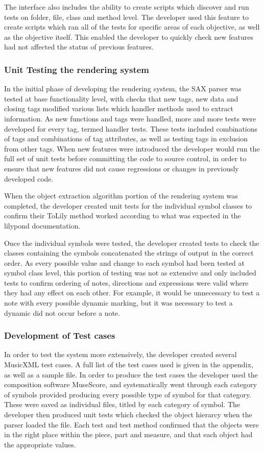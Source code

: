 The interface also includes the ability to create scripts which discover and run tests on folder, file, class and method level. The developer used this feature to create scripts which ran all of the tests for specific areas of each objective, as well as the objective itself. This enabled the developer to quickly check new features had not affected the status of previous features.
\subsubsection{Unit Testing the rendering system}
In the initial phase of developing the rendering system, the SAX parser was tested at base functionality level, with checks that new tags, new data and closing tags modified various lists which handler methods used to extract information. As new functions and tags were handled, more and more tests were developed for every tag, termed handler tests. These tests included combinations of tags and combinations of tag attributes, as well as testing tags in exclusion from other tags. When new features were introduced the developer would run the full set of unit tests before committing the code to source control, in order to ensure that new features did not cause regressions or changes in previously developed code.

When the object extraction algorithm portion of the rendering system was completed, the developer created unit tests for the individual symbol classes to confirm their ToLily method worked according to what was expected in the lilypond documentation.

Once the individual symbols were tested, the developer created tests to check the classes containing the symbols concatenated the strings of output in the correct order. As every possible value and change to each symbol had been tested at symbol class level, this portion of testing was not as extensive and only included tests to confirm ordering of notes, directions and expressions were valid where they had any effect on each other. For example, it would be unnecessary to test a note with every possible dynamic marking, but it was necessary to test a dynamic did not occur before a note.


\subsubsection{Development of Test cases}
In order to test the system more extensively, the developer created several MusicXML test cases. A full list of the test cases used is given in the appendix, as well as a sample file. In order to produce the test cases the developer used the composition software MuseScore, and systematically went through each category of symbols provided producing every possible type of symbol for that category. These were saved as individual files, titled by each category of symbol.
The developer then produced unit tests which checked the object hierarcy when the parser loaded the file. Each test and test method confirmed that the objects were in the right place within the piece, part and measure, and that each object had the appropriate values.

